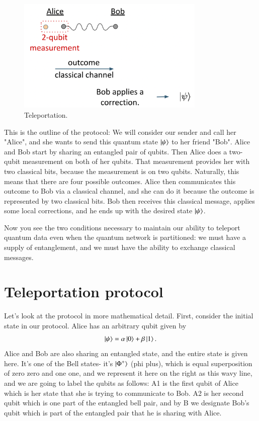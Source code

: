 \begin{figure}[H]
    \centering
    \includegraphics[width=0.8\textwidth]{lesson8/teleportation.png}
        \caption{Teleportation.}
    \label{fig:teleportation}
\end{figure}

This is the outline of the protocol: We will consider our sender and call her "Alice", and she wants to send this quantum state $\ket{\psi}$ to her friend "Bob".  Alice and Bob start by sharing an entangled pair of qubits. Then Alice does a two-qubit measurement on both of her qubits. That measurement provides her with two classical bits, because the measurement is on two qubits.  Naturally, this means that there are four possible outcomes. Alice then communicates this outcome to Bob via a classical channel, and she can do it because the outcome is represented by two classical bits.  Bob then receives this classical message, applies some local corrections, and he ends up with the desired state $\ket{\psi}$.  

Now you see the two conditions necessary to maintain our ability to teleport quantum data even when the quantum network is partitioned: we must have a supply of entanglement, and we must have the ability to exchange classical messages.

\section{Teleportation protocol}


Let's look at the protocol in more mathematical detail.  First, consider the initial state in our protocol. Alice has an arbitrary qubit given by
\begin{align}
    \ket{\psi} = \alpha\ket{0} + \beta\ket{1}.
\end{align}
Alice and Bob are also sharing an entangled state, and the entire state is given here. It's one of the Bell states- it's $\ket{\Phi^+}$ (phi plus), which is equal superposition of zero zero and one one, and we represent it here on the right as this wavy line, and we are going to label the qubits as follows: A1 is the first qubit of Alice which is her state that she is trying to communicate to Bob. A2 is her second qubit which is one part of the entangled bell pair, and by B we designate Bob's qubit which is part of the entangled pair that he is sharing with Alice.

